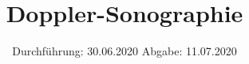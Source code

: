 

\subject{US3}
\title{Doppler-Sonographie}
\date{%
  Durchführung: 30.06.2020
  \hspace{3em}
  Abgabe: 11.07.2020
}



\maketitle
\thispagestyle{empty}
\tableofcontents
\newpage







\printbibliography{}


